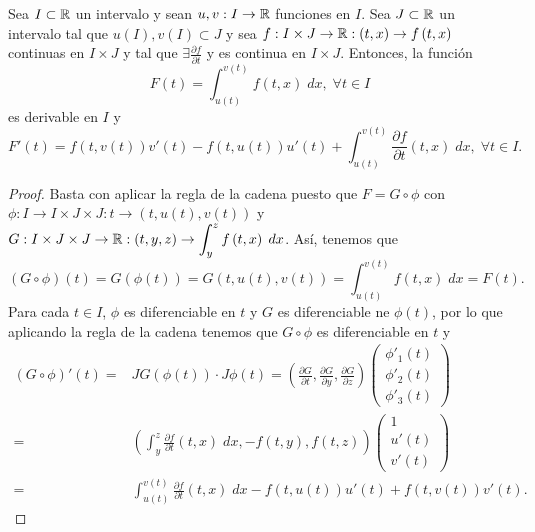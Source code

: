 \begin{theorem}
Sea $\displaystyle I \subset \mathbb{R} $ un intervalo y sean $\displaystyle u,v : I \to \mathbb{R} $ funciones en $\displaystyle I $. Sea $\displaystyle J \subset \mathbb{R} $ un intervalo tal que $\displaystyle u\left(I\right), v\left(I\right)\subset J $ y sea $\displaystyle f : I \times J \to \mathbb{R} : \left(t,x\right) \to f\left(t,x\right) $ continuas en $\displaystyle I \times J $ y tal que $\displaystyle \exists \frac{\partial f}{\partial t} $ y es continua en $\displaystyle I \times J $. Entonces, la función 
\[F\left(t\right)=\int^{v\left(t\right)}_{u\left(t\right)} f\left(t,x\right) \; dx, \; \forall t \in I \]
es derivable en $\displaystyle I $ y 
\[F'\left(t\right)=f\left(t, v\left(t\right)\right)v'\left(t\right)-f\left(t,u\left(t\right)\right)u'\left(t\right)+\int^{v\left(t\right)}_{u\left(t\right)} \frac{\partial f}{\partial t}\left(t,x\right) \; dx, \; \forall t \in I .\]
\end{theorem}
\begin{proof}
Basta con aplicar la regla de la cadena puesto que $\displaystyle F = G \circ \phi $ con $\displaystyle \phi : I \to I \times J \times J : t \to \left(t, u\left(t\right), v\left(t\right)\right) $ y $\displaystyle G : I \times J \times J \to \mathbb{R} : \left(t,y,z\right)\to \int^{z}_{y} f\left(t,x\right) \; dx $. Así, tenemos que
\[\left(G\circ \phi\right)\left(t\right)=G\left(\phi\left(t\right)\right)=G\left(t,u\left(t\right), v\left(t\right)\right)=\int^{v\left(t\right)}_{u\left(t\right)} f\left(t,x\right) \; dx = F\left(t\right) .\]
Para cada $\displaystyle t \in I $, $\displaystyle \phi $ es diferenciable en $\displaystyle t $ y $\displaystyle G $ es diferenciable ne $\displaystyle \phi\left(t\right) $, por lo que aplicando la regla de la cadena tenemos que $\displaystyle G\circ \phi $ es diferenciable en $\displaystyle t $ y 
\[
\begin{split}
	\left(G\circ \phi\right)'\left(t\right)= &JG\left(\phi\left(t\right)\right) \cdot J\phi\left(t\right)=\left(\frac{\partial G}{\partial t}, \frac{\partial G}{\partial y}, \frac{\partial G}{\partial z}\right)\begin{pmatrix} \phi'_{1}\left(t\right) \\ \phi'_{2}\left(t\right)\\ \phi'_{3}\left(t\right) \end{pmatrix}
	\\
	= &   \left(\int^{z}_{y} \frac{\partial f}{\partial t}\left(t,x\right) \; dx, -f\left(t,y\right), f\left(t,z\right)\right)\begin{pmatrix} 1 \\ u'\left(t\right) \\ v'\left(t\right) \end{pmatrix}\\
	= & \int^{v\left(t\right)}_{u\left(t\right)} \frac{\partial f}{\partial t}\left(t,x\right) \; dx - f\left(t,u\left(t\right)\right)u'\left(t\right)+f\left(t,v\left(t\right)\right)v'\left(t\right).
\end{split}
\]
\end{proof}
